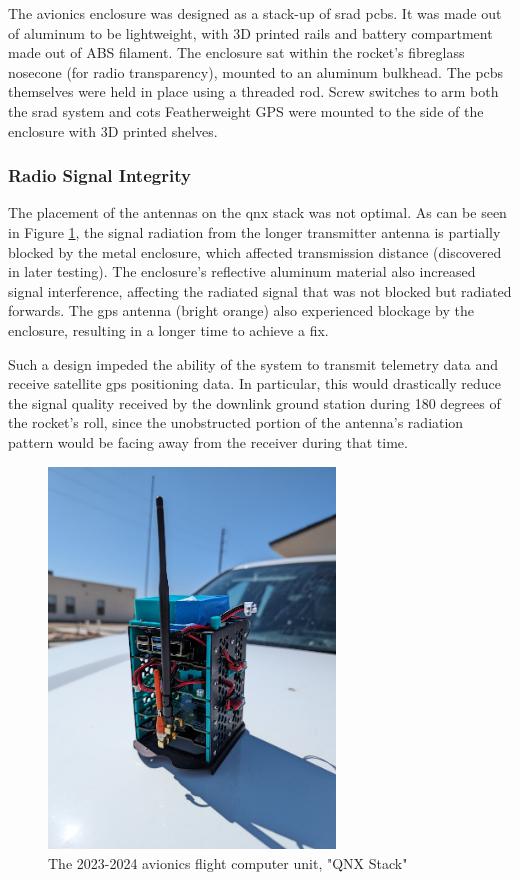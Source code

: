 The avionics enclosure was designed as a stack-up of \gls{srad} \glspl{pcb}. It was made out of aluminum to be
lightweight, with 3D printed rails and battery compartment made out of ABS filament. The enclosure sat within the
rocket's fibreglass nosecone (for radio transparency), mounted to an aluminum bulkhead. The \glspl{pcb} themselves were
held in place using a threaded rod. Screw switches to arm both the \gls{srad} system and \gls{cots} Featherweight GPS
were mounted to the side of the enclosure with 3D printed shelves.

\subsubsection{Radio Signal Integrity}

The placement of the antennas on the \gls{qnx} stack was not optimal. As can be seen in Figure
\ref{fig:preflight-stack}, the signal radiation from the longer transmitter antenna is partially blocked by the metal
enclosure, which affected transmission distance (discovered in later testing). The enclosure's reflective aluminum
material also increased signal interference, affecting the radiated signal that was not blocked but radiated forwards.
The \gls{gps} antenna (bright orange) also experienced blockage by the enclosure, resulting in a longer time to achieve
a fix.

Such a design impeded the ability of the system to transmit telemetry data and receive satellite \gls{gps} positioning
data. In particular, this would drastically reduce the signal quality received by the downlink ground station during
180 degrees of the rocket's roll, since the unobstructed portion of the antenna's radiation pattern would be facing
away from the receiver during that time.

\begin{figure}[H]
    \center
    \includegraphics[width=3in]{assets/images/stack.jpg}
    \caption{The 2023-2024 avionics flight computer unit, "QNX Stack"}
    \label{fig:preflight-stack}
\end{figure}

